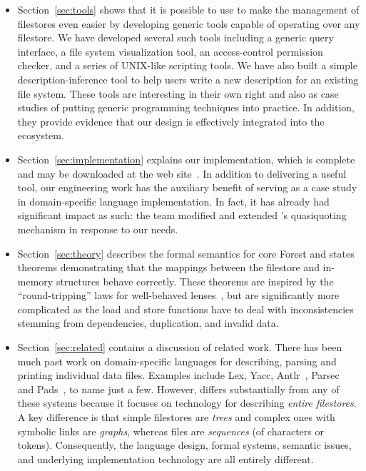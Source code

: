 \begin{itemize}
\item Section~\ref{sec:tools} shows that it is possible to use \forest{}
to make the management
of filestores even easier by developing generic
tools capable of operating over any filestore.  We have developed
several such tools including a generic query interface, a file
system visualization tool, an access-control permission checker, and a 
series of UNIX-like scripting tools.  We have also built a simple
description-inference tool to
help users write a new description for an existing file system.
These tools are interesting in their
own right and also as case studies of putting generic programming
techniques into practice.  In addition, they provide evidence that
our design is effectively integrated into the
\haskell{} ecosystem.
\item Section~\ref{sec:implementation} explains our implementation,
which is complete and may be downloaded at the \forest{} web 
site~\cite{forest-web-site}.  In addition to delivering a useful tool,
our engineering work 
has the auxiliary benefit of serving
as a case study in domain-specific language implementation. 
In fact, it has already had significant impact as such:  
the \haskell{} team modified and extended \haskell{}'s
quasiquoting mechanism in response to our needs. 

\item Section~\ref{sec:theory} describes the 
formal semantics for core Forest and states
theorems demonstrating that the mappings between the filestore and
in-memory structures behave correctly. These theorems are inspired
by the ``round-tripping'' laws for well-behaved lenses~\cite{lenses}, but are
significantly more complicated as the load and store functions have
to deal with inconsistencies stemming from dependencies,
duplication, and invalid data.
\item Section~\ref{sec:related} contains a discussion of related work.
There has been much past work on domain-specific languages for
describing, parsing and printing individual data files. 
Examples include 
Lex, Yacc,
Antlr~\cite{antlr}, Parsec~\cite{LeijenMeijer:parsec} and 
Pads~\cite{fisher+:toplas}, to name just a few.  
However, \forest{} differs
substantially from any of these systems because it focuses on technology
for describing {\em entire filestores}.  
A key difference is that
simple filestores are {\em trees} and complex ones with symbolic links are 
{\em graphs}, whereas files are {\em sequences} (of characters
or tokens). Consequently,
the language design, formal systems,
semantic issues, and underlying implementation 
technology are all entirely different.  
\end{itemize}

